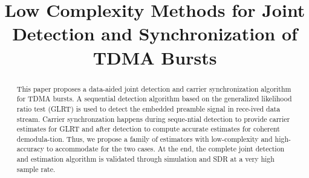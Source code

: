 \documentclass[10pt,final,conference,comsoc]{IEEEtran}
\begin{document}
\title{Low Complexity Methods for Joint Detection and Synchronization of TDMA Bursts}
\author{
}

\maketitle

\begin{abstract}
This paper proposes a data-aided joint detection and carrier synchronization algorithm for 
TDMA bursts. A sequential detection algorithm based on the generalized likelihood ratio test (GLRT)
is used to detect the embedded preamble signal in rece-ived data stream. Carrier synchronzation 
happens during seque-ntial detection to provide carrier estimates for GLRT and after detection
to compute accurate estimates for coherent demodula-tion. Thus, we propose a family of estimators with low-complexity 
and high-accuracy to accommodate for the two cases.
At the end, the complete joint detection and estimation
algorithm is validated through simulation and SDR at a very high sample rate.

\end{abstract}
















\end{document}
